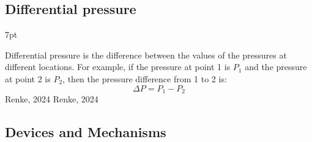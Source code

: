\documentclass{article}
\newcommand{\formalsource}{} %
\newenvironment{formal}[3][]{%
	\renewcommand{\formalsource}{#1}%
	\def\FrameCommand{%
		\hspace{1pt}%
		{\color{#2}\vrule width 2pt}%
		{\color{#3}\vrule width 4pt}%
		\colorbox{#3}%
	}%
	\MakeFramed{\advance\hsize-\width\FrameRestore}%
	\noindent\hspace{-4.55pt}%
	\begin{adjustwidth}{}{7pt}%
		\vspace{2pt}%
	}%
	{%
		\vspace{4pt}%
		\ifx\formalsource\empty %
		\else
		\hfill{\footnotesize{\formalsource}}%
		\fi
	\end{adjustwidth}\endMakeFramed%
}
\newcommand{\wm}[2]{%
	\begin{minipage}{#1\textwidth}
		\centering
		#2
	\end{minipage}%
}
\begin{document}
\begin{center}
\label{representation of pressure}
\end{center}
\vspace{-1em}
\subsection{Differential pressure}
\begin{formal}[Renke, 2024]{black!50!white}{white!97!gray}
	Differential pressure is the difference between the values of the pressures at different locations. For example, if the pressure at point 1 is $P_1$ and the pressure at point 2 is $P_2$, then the pressure difference from 1 to 2 is: 
\begin{equation}
	\Delta P=P_1-P_2
\end{equation}
\end{formal}

\newpage
\subsection{Devices and Mechanisms}
\end{document}

